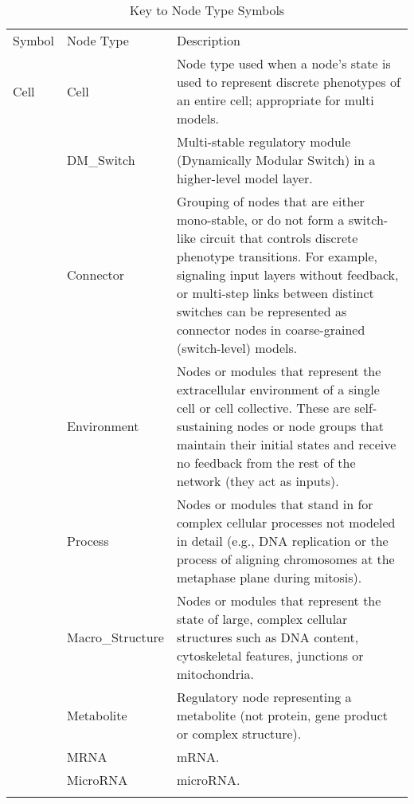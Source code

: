 \documentclass{article}
\begin{document}
\newpage{}\begin{subtables}

\begin{longtable}[c]{@{}llp{}@{}}
\caption{Key to Node Type Symbols}
\endhead{}\\
\toprule
Symbol&Node Type&Description\\
\midrule
{\footnotesize{}Cell}&Cell&Node type used when a node's state is used to represent discrete phenotypes of an entire cell; appropriate for multi models.\\\addlinespace[\dimexpr0.75\defaultaddspace]
{\footnotesize{}DM}&DM\_{}Switch&Multi-stable regulatory module (Dynamically Modular Switch) in a higher-level model layer.\\\addlinespace[\dimexpr0.75\defaultaddspace]
{\footnotesize{}Conn}&Connector&Grouping of nodes that are either mono-stable, or do not form a switch-like circuit that controls discrete phenotype transitions. For example, signaling input layers without feedback, or multi-step links between distinct switches can be represented as connector nodes in coarse-grained (switch-level) models.\\\addlinespace[\dimexpr0.75\defaultaddspace]
{\footnotesize{}Env}&Environment&Nodes or modules that represent the extracellular environment of a single cell or cell collective. These are self-sustaining nodes or node groups that maintain their initial states and receive no feedback from the rest of the network (they act as inputs).\\\addlinespace[\dimexpr0.75\defaultaddspace]
{\footnotesize{}Proc}&Process&Nodes or modules that stand in for complex cellular processes not modeled in detail (e.g., DNA replication or the process of aligning chromosomes at the metaphase plane during mitosis).\\\addlinespace[\dimexpr0.75\defaultaddspace]
{\footnotesize{}MSt}&Macro\_{}Structure&Nodes or modules that represent the state of large, complex cellular structures such as DNA content, cytoskeletal features, junctions or mitochondria.\\\addlinespace[\dimexpr0.75\defaultaddspace]
{\footnotesize{}Met}&Metabolite&Regulatory node representing a metabolite (not protein, gene product or complex structure).\\\addlinespace[\dimexpr0.75\defaultaddspace]
{\footnotesize{}mRNA}&MRNA&mRNA.\\\addlinespace[\dimexpr0.75\defaultaddspace]
{\footnotesize{}miR}&MicroRNA&microRNA.\\

\end{longtable}
\end{subtables}
\end{document}
